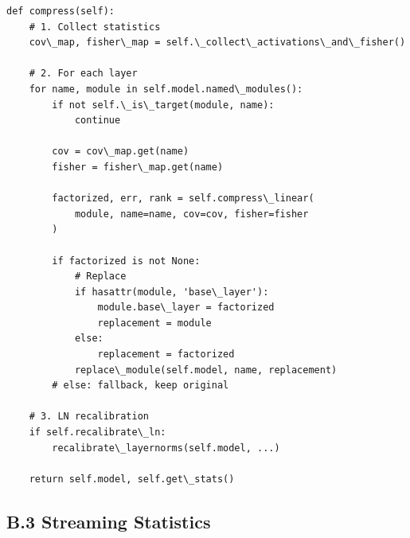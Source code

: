\begin{lstlisting}
def compress(self):
    # 1. Collect statistics
    cov\_map, fisher\_map = self.\_collect\_activations\_and\_fisher()
    
    # 2. For each layer
    for name, module in self.model.named\_modules():
        if not self.\_is\_target(module, name):
            continue
        
        cov = cov\_map.get(name)
        fisher = fisher\_map.get(name)
        
        factorized, err, rank = self.compress\_linear(
            module, name=name, cov=cov, fisher=fisher
        )
        
        if factorized is not None:
            # Replace
            if hasattr(module, 'base\_layer'):
                module.base\_layer = factorized
                replacement = module
            else:
                replacement = factorized
            replace\_module(self.model, name, replacement)
        # else: fallback, keep original
    
    # 3. LN recalibration
    if self.recalibrate\_ln:
        recalibrate\_layernorms(self.model, ...)
    
    return self.model, self.get\_stats()
\end{lstlisting}

\subsection{B.3 Streaming Statistics}

